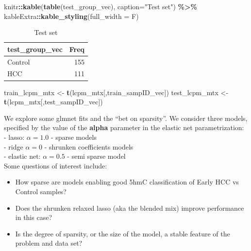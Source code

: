 \documentclass[
]{book}
\newenvironment{Shaded}{\begin{snugshade}}{\end{snugshade}}
\newcommand{\DataTypeTok}[1]{\textcolor[rgb]{0.13,0.29,0.53}{#1}}
\newcommand{\KeywordTok}[1]{\textcolor[rgb]{0.13,0.29,0.53}{\textbf{#1}}}
\newcommand{\NormalTok}[1]{#1}
\newcommand{\OperatorTok}[1]{\textcolor[rgb]{0.81,0.36,0.00}{\textbf{#1}}}
\newcommand{\StringTok}[1]{\textcolor[rgb]{0.31,0.60,0.02}{#1}}
\providecommand{\tightlist}{%
  \setlength{\itemsep}{0pt}\setlength{\parskip}{0pt}}
\begin{document}
\begin{Shaded}
\begin{Highlighting}[]
\NormalTok{knitr}\OperatorTok{::}\KeywordTok{kable}\NormalTok{(}\KeywordTok{table}\NormalTok{(test\_group\_vec),}
  \DataTypeTok{caption=}\StringTok{"Test set"}\NormalTok{) }\OperatorTok{\%>\%}
\StringTok{   }\NormalTok{kableExtra}\OperatorTok{::}\KeywordTok{kable\_styling}\NormalTok{(}\DataTypeTok{full\_width =}\NormalTok{ F)}
\end{Highlighting}
\end{Shaded}

\begin{table}

\caption{\label{tab:getTrainVal}Test set}
\centering
\begin{tabular}[t]{l|r}
\hline
test\_group\_vec & Freq\\
\hline
Control & 155\\
\hline
HCC & 111\\
\hline
\end{tabular}
\end{table}

\begin{Shaded}
\begin{Highlighting}[]
\NormalTok{train\_lcpm\_mtx <{-}}\StringTok{ }\KeywordTok{t}\NormalTok{(lcpm\_mtx[,train\_sampID\_vec])}
\NormalTok{test\_lcpm\_mtx <{-}}\StringTok{ }\KeywordTok{t}\NormalTok{(lcpm\_mtx[,test\_sampID\_vec])}
\end{Highlighting}
\end{Shaded}

We explore some glmnet fits and the ``bet on sparsity''.
We consider three models, specified by the value of the
\textbf{alpha} parameter in the elastic net parametrization:\\
- lasso: \(\alpha = 1.0\) - sparse models\\
- ridge \(\alpha = 0\) - shrunken coefficients models\\
- elastic net: \(\alpha = 0.5\) - semi sparse model\\

Some questions of interest include:

\begin{itemize}
\tightlist
\item
  How sparse are models enabling good 5hmC classification of Early HCC vs Control samples?
\end{itemize}

\begin{itemize}
\item
  Does the shrunken relaxed lasso (aka the blended mix) improve performance in this case?
\item
  Is the degree of sparsity, or the size of the model, a stable feature of the problem and data set?
\end{itemize}
\end{document}
